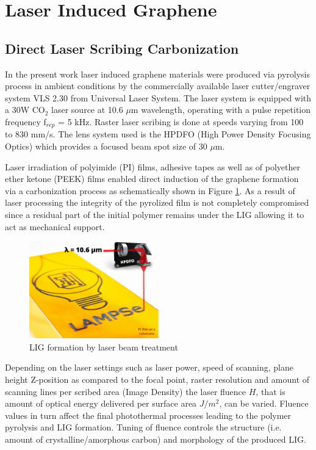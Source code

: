 \section{Laser Induced Graphene}


\subsection{Direct Laser Scribing Carbonization}

In the present work laser induced graphene materials were produced via pyrolysis process in ambient conditions by the commercially available laser cutter/engraver system VLS 2.30 from Universal Laser System. The laser system is equipped with a 30W CO$_2$ laser source at 10.6 $\mu$m wavelength, operating with a pulse repetition frequency f$_{rep}$ = 5 kHz. Raster laser scribing is done at speeds varying from 100 to 830  mm/s. The lens system used is the HPDFO (High Power Density Focusing Optics) which provides a focused beam spot size of 30 $\mu$m. 

Laser irradiation of polyimide (PI) films, adhesive tapes as well as of polyether ether ketone (PEEK) films enabled direct induction of the graphene formation via a carbonization process as schematically shown in Figure \ref{fig:LIG_formation}. As a result of laser processing the integrity of the pyrolized film is not completely compromised since a residual part of the initial polymer remains under the LIG allowing it to act as mechanical support.

\begin{figure}[H]
\centering
\includegraphics[width=0.5\textwidth]{Figures/ExperimentalSetup/LIG-LAMPSE.jpg}
\medskip
\caption{LIG formation by laser beam treatment}
\label{fig:LIG_formation}
\end{figure}

Depending on the laser settings such as laser power, speed of scanning, plane height Z-position as compared to the focal point, raster resolution  and amount of scanning lines per scribed area (Image Density) the laser fluence $H$, that is amount of optical energy delivered per surface area $J/m^2$, can be varied. Fluence values in turn affect the final photothermal processes leading to the polymer pyrolysis and LIG formation. Tuning of fluence controls the structure (i.e. amount of crystalline/amorphous carbon) and morphology of the produced LIG.

